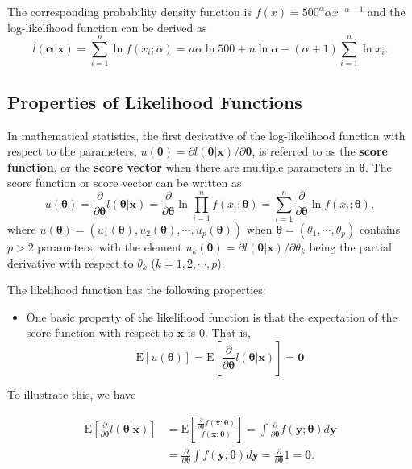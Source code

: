 \documentclass[]{book}
\providecommand{\tightlist}{%
  \setlength{\itemsep}{0pt}\setlength{\parskip}{0pt}}
\theoremstyle{definition}
\theoremstyle{definition}
\theoremstyle{definition}
\theoremstyle{remark}
\begin{document}
The corresponding probability density function is
\(f(x) = 500^{\alpha} \alpha x^{-\alpha-1}\) and the log-likelihood
function can be derived as
\[l(\boldsymbol \alpha|\mathbf{x}) = \sum_{i=1}^n \ln f(x_i;\alpha) = n \alpha \ln 500 +n \ln \alpha -(\alpha+1)  \sum_{i=1}^n \ln x_i .\]

\subsection{Properties of Likelihood
Functions}\label{properties-of-likelihood-functions}

In mathematical statistics, the first derivative of the log-likelihood
function with respect to the parameters,
\(u(\boldsymbol\theta)=\partial l(\boldsymbol \theta|\mathbf{x})/\partial \boldsymbol \theta\),
is referred to as the \textbf{score function}, or the \textbf{score
vector} when there are multiple parameters in \(\boldsymbol\theta\). The
score function or score vector can be written as
\[u(\boldsymbol\theta)=\frac{ \partial}{\partial \boldsymbol \theta} l(\boldsymbol \theta|\mathbf{x})
    =\frac{ \partial}{\partial \boldsymbol \theta} \ln \prod_{i=1}^n
    f(x_i;\boldsymbol \theta ) =\sum_{i=1}^n \frac{
    \partial}{\partial \boldsymbol \theta}
    \ln f(x_i;\boldsymbol \theta ),\] where
\(u(\boldsymbol\theta)=(u_1(\boldsymbol\theta),u_2(\boldsymbol\theta),\cdots,u_p(\boldsymbol\theta))\)
when \(\boldsymbol\theta=(\theta_1,\cdots,\theta_p)\) contains \(p>2\)
parameters, with the element
\(u_k(\boldsymbol\theta)=\partial l(\boldsymbol \theta|\mathbf{x})/\partial \theta_k\)
being the partial derivative with respect to \(\theta_k\)
(\(k=1,2,\cdots,p\)).

The likelihood function has the following properties:

\begin{itemize}
\tightlist
\item
  One basic property of the likelihood function is that the expectation
  of the score function with respect to \(\mathbf{x}\) is 0. That is,
  \[\mathrm{E}[u(\boldsymbol\theta)]=\mathrm{E} \left[ \frac{ \partial}{\partial \boldsymbol \theta}
  l(\boldsymbol \theta|\mathbf{x}) \right] = \mathbf 0\]
\end{itemize}

To illustrate this, we have

\[\begin{aligned}
    \mathrm{E} \left[ \frac{ \partial}{\partial \boldsymbol \theta} l(\boldsymbol \theta|\mathbf{x}) \right]
    &= \mathrm{E} \left[ \frac{\frac{\partial}{\partial \boldsymbol \theta}f(\mathbf{x};\boldsymbol \theta)}{f(\mathbf{x};\boldsymbol \theta )}  \right]
    = \int\frac{\partial}{\partial \boldsymbol \theta} f(\mathbf{y};\boldsymbol \theta ) d \mathbf y \\
    &= \frac{\partial}{\partial \boldsymbol \theta} \int f(\mathbf{y};\boldsymbol \theta ) d \mathbf y
    = \frac{\partial}{\partial \boldsymbol \theta} 1 = \mathbf 0.\end{aligned}\]
\end{document}
